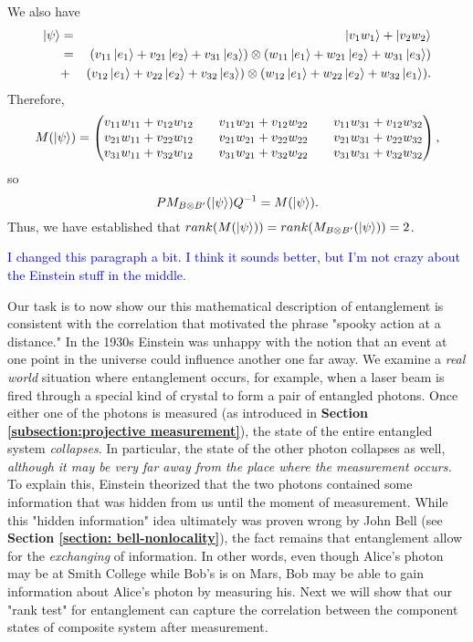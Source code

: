 \begin{example}

We also have
\begin{eqnarray*}
\ket{\psi}&=&\ket{v_1 w_1}+\ket{v_2 w_2}\\
&=& (v_{11}\ket{e_1}+v_{21}\ket{e_2}+v_{31}\ket{e_3}) \otimes (w_{11}\ket{e_1}+w_{21}\ket{e_2}+w_{31}\ket{e_3}) \\
&+& (v_{12}\ket{e_1}+v_{22}\ket{e_2}+v_{32}\ket{e_3}) \otimes (w_{12}\ket{e_1}+w_{22}\ket{e_2}+w_{32}\ket{e_1}).
\end{eqnarray*}
Therefore,
\begin{equation}
M(\ket{\psi})=
\begin{pmatrix}
v_{11}w_{11}+v_{12}w_{12} && v_{11}w_{21}+v_{12}w_{22} && v_{11}w_{31}+v_{12}w_{32}\\
v_{21}w_{11}+v_{22}w_{12} && v_{21}w_{21}+v_{22}w_{22} && v_{21}w_{31}+v_{22}w_{32} \\
v_{31}w_{11}+v_{32}w_{12} && v_{31}w_{21}+v_{32}w_{22} && v_{31}w_{31}+v_{32}w_{32} 
\end{pmatrix},
\end{equation}
so 
$$PM_{B \otimes B'}(\ket{\psi})Q^{-1}=M(\ket{\psi}).$$
Thus, we have established that $rank(M(\ket{\psi}))=rank(M_{B \otimes B'}(\ket{\psi}))=2$.
\end{example}


\textcolor{blue}{I changed this paragraph a bit.  I think it sounds better, but I'm not crazy about the Einstein stuff in the middle.}

Our task is to now show our this mathematical description of entanglement is consistent with the correlation that motivated the phrase "spooky action at a distance." In the 1930s Einstein was unhappy with the notion that an event at one point in the universe could influence another one far away.  We examine a {\emph{real world}} situation where entanglement occurs, for example, when a laser beam is fired through a special kind of crystal to form a pair of entangled photons. Once either one of the photons is measured (as introduced in \textbf{Section \ref{subsection:projective measurement}}), the state of the entire entangled system {\emph{collapses}}.  In particular, the state of the other photon collapses as well, {\emph{although it may be very far away from the place where the measurement occurs.}} To explain this, Einstein theorized that the two photons contained some information that was hidden from us until the moment of measurement. While this "hidden information" idea ultimately was proven wrong by John Bell (see \textbf{Section \ref{section: bell-nonlocality}}), the fact remains that entanglement allow for the {\emph{exchanging}} of information. In other words, even though Alice's photon may be at Smith College while Bob's is on Mars, Bob may be able to gain information about Alice's photon by measuring his. Next we will show that our "rank test" for entanglement can capture the correlation between the component states of composite system after measurement.

